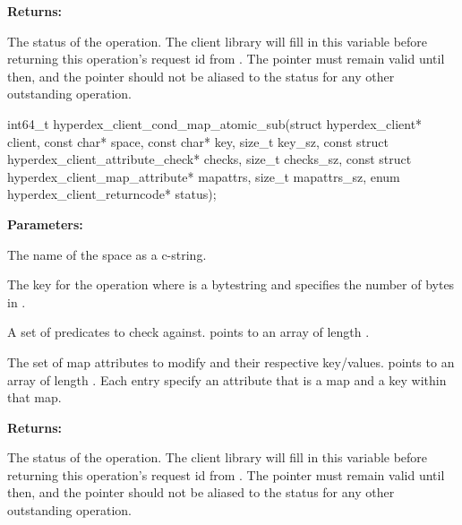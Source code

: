 \noindent\textbf{Returns:}
\begin{description}[labelindent=\widthof{{\code{status}}},leftmargin=*,noitemsep,nolistsep,align=right]
\item[\code{status}] The status of the operation.  The client library will fill in this variable before returning this operation's request id from .  The pointer must remain valid until then, and the pointer should not be aliased to the status for any other outstanding operation.
\end{description}

\funcsep
{}
\begin{ccode}
int64_t hyperdex_client_cond_map_atomic_sub(struct hyperdex_client* client,
                const char* space,
                const char* key, size_t key_sz,
                const struct hyperdex_client_attribute_check* checks, size_t checks_sz,
                const struct hyperdex_client_map_attribute* mapattrs, size_t mapattrs_sz,
                enum hyperdex_client_returncode* status);
\end{ccode}
\funcdesc 

\noindent\textbf{Parameters:}
\begin{description}[labelindent=\widthof{{\code{mapattrs}, \code{mapattrs\_sz}}},leftmargin=*,noitemsep,nolistsep,align=right]
\item[\code{space}] The name of the space as a c-string.
\item[\code{key}, \code{key\_sz}] The key for the operation where  is a bytestring and  specifies the number of bytes in .
\item[\code{checks}, \code{checks\_sz}] A set of predicates to check against.   points to an array of length .
\item[\code{mapattrs}, \code{mapattrs\_sz}] The set of map attributes to modify and their respective key/values.   points to an array of length .  Each entry specify an attribute that is a map and a key within that map.
\end{description}

\noindent\textbf{Returns:}
\begin{description}[labelindent=\widthof{{\code{status}}},leftmargin=*,noitemsep,nolistsep,align=right]
\item[\code{status}] The status of the operation.  The client library will fill in this variable before returning this operation's request id from .  The pointer must remain valid until then, and the pointer should not be aliased to the status for any other outstanding operation.
\end{description}

